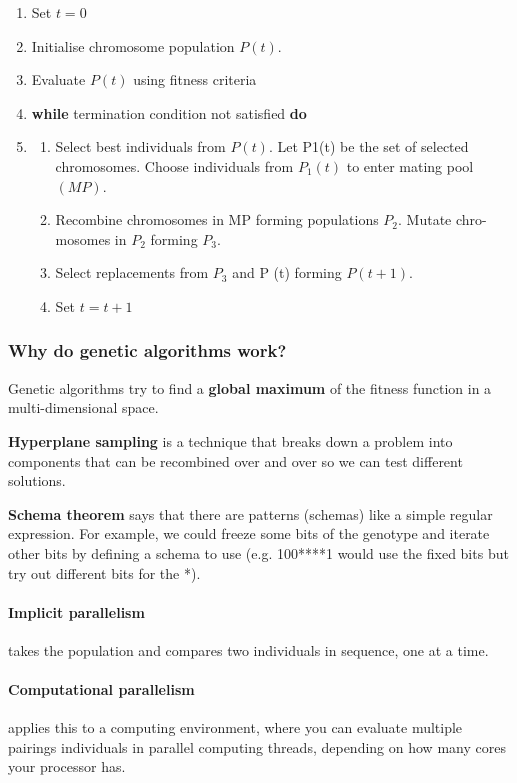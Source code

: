 \begin{enumerate}
    \item Set $t = 0$
    \item Initialise chromosome population $P(t)$.
    \item Evaluate $P(t)$ using fitness criteria
    \item \textbf{while} termination condition not satisfied \textbf{do}
    \item \begin{enumerate}
              \item Select best individuals from $P(t)$. Let P1(t) be the set of selected chromosomes. Choose individuals from $P_{1}(t)$ to enter mating pool $(MP)$.
              \item Recombine chromosomes in MP forming populations $P_2$. Mutate chro- mosomes in $P_2$ forming $P_3$.
              \item Select replacements from $P_3$ and P (t) forming $P (t + 1)$.
              \item Set $t=t+1$
          \end{enumerate}
\end{enumerate}

\subsubsection{Why do genetic algorithms work?}

Genetic algorithms try to find a \textbf{global maximum} of the fitness function in a multi-dimensional space.

\textbf{Hyperplane sampling} is a technique that breaks down a problem into components that can be recombined over and over so we can test different solutions.

\textbf{Schema theorem} says that there are patterns (schemas) like a simple regular expression. For example, we could freeze some bits of the genotype and iterate other bits by defining a schema to use (e.g. 100****1 would use the fixed bits but try out different bits for the *).

\paragraph{Implicit parallelism} takes the population and compares two individuals in sequence, one at a time.

\paragraph{Computational parallelism} applies this to a computing environment, where you can evaluate multiple pairings individuals in parallel computing threads, depending on how many cores your processor has.

